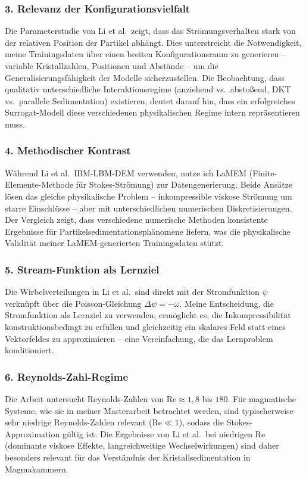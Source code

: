 \documentclass[a4paper,12pt]{article}
\begin{document}
\subsubsection*{3. Relevanz der Konfigurationsvielfalt}

Die Parameterstudie von Li et al.\ zeigt, dass das Str\"omungsverhalten stark von der relativen Position der Partikel abh\"angt. Dies unterstreicht die Notwendigkeit, meine Trainingsdaten \"uber einen breiten Konfigurationsraum zu generieren -- variable Kristallzahlen, Positionen und Abst\"ande -- um die Generalisierungsf\"ahigkeit der Modelle sicherzustellen. Die Beobachtung, dass qualitativ unterschiedliche Interaktionsregime (anziehend vs.\ absto{\ss}end, DKT vs.\ parallele Sedimentation) existieren, deutet darauf hin, dass ein erfolgreiches Surrogat-Modell diese verschiedenen physikalischen Regime intern repr\"asentieren muss.

\subsubsection*{4. Methodischer Kontrast}

W\"ahrend Li et al.\ IBM-LBM-DEM verwenden, nutze ich LaMEM (Finite-Elemente-Methode f\"ur Stokes-Str\"omung) zur Datengenerierung. Beide Ans\"atze l\"osen das gleiche physikalische Problem -- inkompressible viskose Str\"omung um starre Einschl\"usse -- aber mit unterschiedlichen numerischen Diskretisierungen. Der Vergleich zeigt, dass verschiedene numerische Methoden konsistente Ergebnisse f\"ur Partikelsedimentationsph\"anomene liefern, was die physikalische Validit\"at meiner LaMEM-generierten Trainingsdaten st\"utzt.

\subsubsection*{5. Stream-Funktion als Lernziel}

Die Wirbelverteilungen in Li et al.\ sind direkt mit der Stromfunktion $\psi$ verkn\"upft \"uber die Poisson-Gleichung $\Delta\psi = -\omega$. Meine Entscheidung, die Stromfunktion als Lernziel zu verwenden, erm\"oglicht es, die Inkompressibilit\"at konstruktionsbedingt zu erf\"ullen und gleichzeitig ein skalares Feld statt eines Vektorfeldes zu approximieren -- eine Vereinfachung, die das Lernproblem konditioniert.

\subsubsection*{6. Reynolds-Zahl-Regime}

Die Arbeit untersucht Reynolds-Zahlen von $\mathrm{Re} \approx 1{,}8$ bis $180$. F\"ur magmatische Systeme, wie sie in meiner Masterarbeit betrachtet werden, sind typischerweise sehr niedrige Reynolds-Zahlen relevant ($\mathrm{Re} \ll 1$), sodass die Stokes-Approximation g\"ultig ist. Die Ergebnisse von Li et al.\ bei niedrigen Re (dominante viskose Effekte, langreichweitige Wechselwirkungen) sind daher besonders relevant f\"ur das Verst\"andnis der Kristallsedimentation in Magmakammern.
\end{document}
